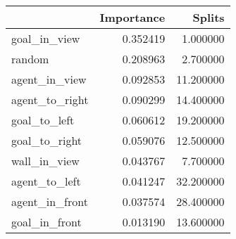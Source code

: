 \begin{tabular}{lrr}
\toprule
 & Importance & Splits \\
\midrule
goal\_in\_view & 0.352419 & 1.000000 \\
random & 0.208963 & 2.700000 \\
agent\_in\_view & 0.092853 & 11.200000 \\
agent\_to\_right & 0.090299 & 14.400000 \\
goal\_to\_left & 0.060612 & 19.200000 \\
goal\_to\_right & 0.059076 & 12.500000 \\
wall\_in\_view & 0.043767 & 7.700000 \\
agent\_to\_left & 0.041247 & 32.200000 \\
agent\_in\_front & 0.037574 & 28.400000 \\
goal\_in\_front & 0.013190 & 13.600000 \\
\bottomrule
\end{tabular}

